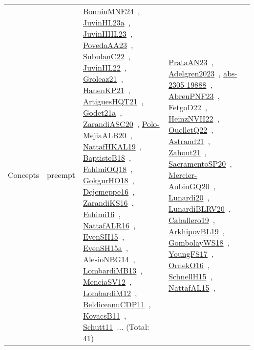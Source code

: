 {\begin{longtable}{lp{3cm}>{\raggedright\arraybackslash}p{6cm}>{\raggedright\arraybackslash}p{6cm}>{\raggedright\arraybackslash}p{8cm}}
Concepts & preempt & \href{../works/BonninMNE24.pdf}{BonninMNE24}~\cite{BonninMNE24}, \href{../works/JuvinHL23a.pdf}{JuvinHL23a}~\cite{JuvinHL23a}, \href{../works/JuvinHHL23.pdf}{JuvinHHL23}~\cite{JuvinHHL23}, \href{../works/PovedaAA23.pdf}{PovedaAA23}~\cite{PovedaAA23}, \href{../works/SubulanC22.pdf}{SubulanC22}~\cite{SubulanC22}, \href{../works/JuvinHL22.pdf}{JuvinHL22}~\cite{JuvinHL22}, \href{../works/Groleaz21.pdf}{Groleaz21}~\cite{Groleaz21}, \href{../works/HanenKP21.pdf}{HanenKP21}~\cite{HanenKP21}, \href{../works/ArtiguesHQT21.pdf}{ArtiguesHQT21}~\cite{ArtiguesHQT21}, \href{../works/Godet21a.pdf}{Godet21a}~\cite{Godet21a}, \href{../works/ZarandiASC20.pdf}{ZarandiASC20}~\cite{ZarandiASC20}, \href{../works/Polo-MejiaALB20.pdf}{Polo-MejiaALB20}~\cite{Polo-MejiaALB20}, \href{../works/NattafHKAL19.pdf}{NattafHKAL19}~\cite{NattafHKAL19}, \href{../works/BaptisteB18.pdf}{BaptisteB18}~\cite{BaptisteB18}, \href{../works/FahimiOQ18.pdf}{FahimiOQ18}~\cite{FahimiOQ18}, \href{../works/GokgurHO18.pdf}{GokgurHO18}~\cite{GokgurHO18}, \href{../works/Dejemeppe16.pdf}{Dejemeppe16}~\cite{Dejemeppe16}, \href{../works/ZarandiKS16.pdf}{ZarandiKS16}~\cite{ZarandiKS16}, \href{../works/Fahimi16.pdf}{Fahimi16}~\cite{Fahimi16}, \href{../works/NattafALR16.pdf}{NattafALR16}~\cite{NattafALR16}, \href{../works/EvenSH15.pdf}{EvenSH15}~\cite{EvenSH15}, \href{../works/EvenSH15a.pdf}{EvenSH15a}~\cite{EvenSH15a}, \href{../works/AlesioNBG14.pdf}{AlesioNBG14}~\cite{AlesioNBG14}, \href{../works/LombardiMB13.pdf}{LombardiMB13}~\cite{LombardiMB13}, \href{../works/MenciaSV12.pdf}{MenciaSV12}~\cite{MenciaSV12}, \href{../works/LombardiM12.pdf}{LombardiM12}~\cite{LombardiM12}, \href{../works/BeldiceanuCDP11.pdf}{BeldiceanuCDP11}~\cite{BeldiceanuCDP11}, \href{../works/KovacsB11.pdf}{KovacsB11}~\cite{KovacsB11}, \href{../works/Schutt11.pdf}{Schutt11}~\cite{Schutt11}... (Total: 41) & \href{../works/PrataAN23.pdf}{PrataAN23}~\cite{PrataAN23}, \href{../works/Adelgren2023.pdf}{Adelgren2023}~\cite{Adelgren2023}, \href{../works/abs-2305-19888.pdf}{abs-2305-19888}~\cite{abs-2305-19888}, \href{../works/AbreuPNF23.pdf}{AbreuPNF23}~\cite{AbreuPNF23}, \href{../works/FetgoD22.pdf}{FetgoD22}~\cite{FetgoD22}, \href{../works/HeinzNVH22.pdf}{HeinzNVH22}~\cite{HeinzNVH22}, \href{../works/OuelletQ22.pdf}{OuelletQ22}~\cite{OuelletQ22}, \href{../works/Astrand21.pdf}{Astrand21}~\cite{Astrand21}, \href{../works/Zahout21.pdf}{Zahout21}~\cite{Zahout21}, \href{../works/SacramentoSP20.pdf}{SacramentoSP20}~\cite{SacramentoSP20}, \href{../works/Mercier-AubinGQ20.pdf}{Mercier-AubinGQ20}~\cite{Mercier-AubinGQ20}, \href{../works/Lunardi20.pdf}{Lunardi20}~\cite{Lunardi20}, \href{../works/LunardiBLRV20.pdf}{LunardiBLRV20}~\cite{LunardiBLRV20}, \href{../works/Caballero19.pdf}{Caballero19}~\cite{Caballero19}, \href{../works/ArkhipovBL19.pdf}{ArkhipovBL19}~\cite{ArkhipovBL19}, \href{../works/GombolayWS18.pdf}{GombolayWS18}~\cite{GombolayWS18}, \href{../works/YoungFS17.pdf}{YoungFS17}~\cite{YoungFS17}, \href{../works/OrnekO16.pdf}{OrnekO16}~\cite{OrnekO16}, \href{../works/SchnellH15.pdf}{SchnellH15}~\cite{SchnellH15}, \href{../works/NattafAL15.pdf}{NattafAL15}~\cite{NattafAL15}, 
\end{longtable}}
